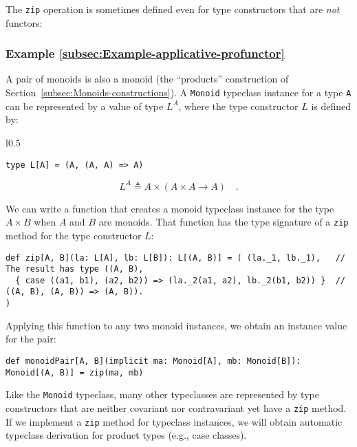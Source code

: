 The \lstinline!zip! operation is sometimes defined even for type
constructors that are \emph{not} functors:

\subsubsection{Example \label{subsec:Example-applicative-profunctor}\ref{subsec:Example-applicative-profunctor}}

A pair of monoids is also a monoid (the \textsf{``}products\textsf{''} construction
of Section~\ref{subsec:Monoids-constructions}). A \lstinline!Monoid!
typeclass instance for a type \lstinline!A! can be represented by
a value of type $L^{A}$, where the type constructor $L$ is defined
by:

\begin{wrapfigure}{l}{0.5\columnwidth}%
\vspace{-0.85\baselineskip}
\begin{lstlisting}
type L[A] = (A, (A, A) => A)
\end{lstlisting}

\vspace{-0.25\baselineskip}
\end{wrapfigure}%

\noindent \vspace{-0.5\baselineskip}
\[
L^{A}\triangleq A\times\left(A\times A\rightarrow A\right)\quad.
\]

\noindent We can write a function that creates a monoid typeclass
instance for the type $A\times B$ when $A$ and $B$ are monoids.
That function has the type signature of a \lstinline!zip! method
for the type constructor $L$:
\begin{lstlisting}
def zip[A, B](la: L[A], lb: L[B]): L[(A, B)] = ( (la._1, lb._1),   // The result has type ((A, B),
  { case ((a1, b1), (a2, b2)) => (la._2(a1, a2), lb._2(b1, b2)) }  // ((A, B), (A, B)) => (A, B)).
)
\end{lstlisting}
Applying this function to any two monoid instances, we obtain an instance
value for the pair:
\begin{lstlisting}
def monoidPair[A, B](implicit ma: Monoid[A], mb: Monoid[B]): Monoid[(A, B)] = zip(ma, mb)
\end{lstlisting}

Like the \lstinline!Monoid! typeclass, many other typeclasses are
represented by type constructors that are neither covariant nor contravariant
yet have a \lstinline!zip! method. If we implement a \lstinline!zip!
method for typeclass instances, we will obtain automatic typeclass
derivation for product types (e.g., case classes).

